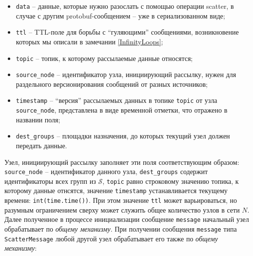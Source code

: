 \documentclass{article}
\theoremstyle{plain}
\theoremstyle{plain}
\theoremstyle{plain}
\theoremstyle{plain}
\theoremstyle{definition}
\theoremstyle{remark}
\theoremstyle{plain}
\begin{document}
\begin{itemize}
    \item \texttt{data} -- данные, которые нужно разослать с помощью операции scatter, в случае с другим protobuf-сообщением -- уже в сериализованном виде;
    
    \item \texttt{ttl} -- TTL-поле для борьбы с \enquote{гуляющими} сообщениями, возникновение которых мы описали в замечании \ref{InfinityLoops};
    
    \item \texttt{topic} -- топик, к которому рассылаемые данные относятся;
    
    \item \texttt{source\_node} -- идентификатор узла, инициирующий рассылку, нужен для раздельного версионирования сообщений от разных источников;
    
    \item \texttt{timestamp} -- \enquote{версия} рассылаемых данных в топике \texttt{topic} от узла \texttt{source\_node}, представлена в виде временной отметки, что отражено в названии поля;
    
    \item \texttt{dest\_groups} -- площадки назначения, до которых текущий узел должен передать данные.
\end{itemize}

Узел, инициирующий рассылку заполняет эти поля соответствующим образом: \\
\texttt{source\_node} -- идентификатор данного узла, \texttt{dest\_groups} содержит идентификаторы всех групп из $\mathcal{S}$, \texttt{topic} равно строковому значению топика, к которому данные отнсятся, значение \texttt{timestamp} устанавливается текущему времени: \texttt{int(time.time())}. При этом значение \texttt{ttl} может варьироваться, но разумным ограничением сверху может служить общее количество узлов в сети $N$. Далее полученное в процессе инициализации сообщение \texttt{message} начальный узел обрабатывает по \textit{общему механизму}. При получении сообщения \texttt{message} типа \texttt{ScatterMessage} любой другой узел обрабатывает его также по \textit{общему механизму}:
\end{document}
